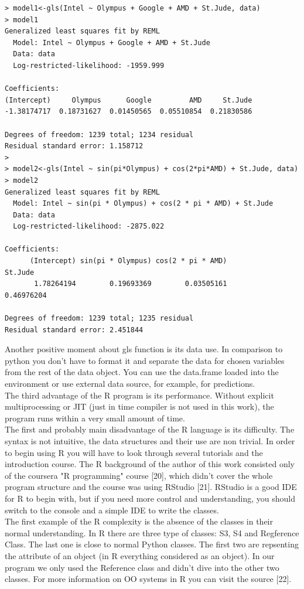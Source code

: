\documentclass{article}
\begin{document}
\begin{verbatim}
> model1<-gls(Intel ~ Olympus + Google + AMD + St.Jude, data)
> model1
Generalized least squares fit by REML
  Model: Intel ~ Olympus + Google + AMD + St.Jude 
  Data: data 
  Log-restricted-likelihood: -1959.999

Coefficients:
(Intercept)     Olympus      Google         AMD     St.Jude 
-1.38174717  0.18731627  0.01450565  0.05510854  0.21830586 

Degrees of freedom: 1239 total; 1234 residual
Residual standard error: 1.158712
>
> model2<-gls(Intel ~ sin(pi*Olympus) + cos(2*pi*AMD) + St.Jude, data)
> model2
Generalized least squares fit by REML
  Model: Intel ~ sin(pi * Olympus) + cos(2 * pi * AMD) + St.Jude 
  Data: data 
  Log-restricted-likelihood: -2875.022

Coefficients:
      (Intercept) sin(pi * Olympus) cos(2 * pi * AMD)           St.Jude 
       1.78264194        0.19693369        0.03505161        0.46976204 

Degrees of freedom: 1239 total; 1235 residual
Residual standard error: 2.451844
\end{verbatim}
Another positive moment about gls function is its data use. In comparison to python you don't have to format it and separate the data for chosen variables from the rest of the data object. You can use the data.frame loaded into the environment or use external data source, for example, for predictions.\\
The third advantage of the R program is its performance. Without explicit multiprocessing or JIT (just in time compiler is not used in this work), the program runs within a very small amount of time.\\
The first and probably main disadvantage of the R language is its difficulty. The syntax is not intuitive, the data structures and their use are non trivial. In order to begin using R you will have to look through several tutorials and the introduction course. The R background of the author of this work consisted only of the coursera "R programming" course [20], which didn't cover the whole program structure and the course was using RStudio [21]. RStudio is a good IDE for R to begin with, but if you need more control and understanding, you should switch to the console and a simple IDE to write the classes.\\
The first example of the R complexity is the absence of the classes in their normal understanding. In R there are three type of classes: S3, S4 and Regference Class. The last one is close to normal Python classes. The first two are repsenting the attribute of an object (in R everything considered as an object). In our program we only used the Reference class and didn't dive into the other two classes. For more information on OO systems in R you can visit the source [22]. \\
\end{document}
